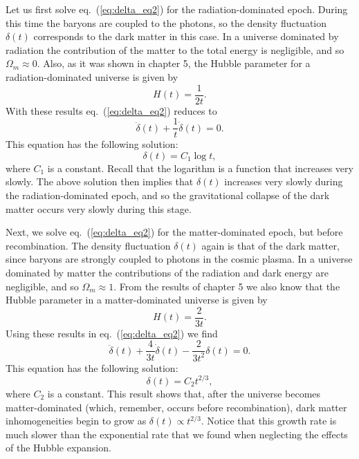 Let us first solve eq.\ (\ref{eq:delta_eq2}) for the radiation-dominated epoch. During this time the baryons are coupled to the photons, so the density fluctuation $\delta(t)$ corresponds to the dark matter in this case. In a universe dominated by radiation the contribution of the matter to the total energy is negligible, and so $\Omega_m\approx0$. Also, as it was shown in chapter 5, the Hubble parameter for a radiation-dominated universe is given by
\begin{equation}
H(t)=\frac{1}{2t}.
\end{equation}
With these results eq.\ (\ref{eq:delta_eq2}) reduces to
\begin{equation} \label{eq:delta_eq_rad}
\ddot{\delta}(t)+\frac{1}{t}\dot{\delta}(t)=0.
\end{equation}
This equation has the following solution:
\begin{equation}
\delta(t)=C_1\log t,
\end{equation}
where $C_1$ is a constant. Recall that the logarithm is a function that increases very slowly. The above solution then implies that $\delta(t)$ increases very slowly during the radiation-dominated epoch, and so the gravitational collapse of the dark matter occurs very slowly during this stage.

Next, we solve eq.\ (\ref{eq:delta_eq2}) for the matter-dominated epoch, but before recombination. The density fluctuation $\delta(t)$ again is that of the dark matter, since baryons are strongly coupled to photons in the cosmic plasma. In a universe dominated by matter the contributions of the radiation and dark energy are negligible, and so $\Omega_m\approx 1$. From the results of chapter 5 we also know that the Hubble parameter in a matter-dominated universe is given by
\begin{equation}
H(t)=\frac{2}{3t}.
\end{equation}
Using these results in eq.\ (\ref{eq:delta_eq2}) we find
\begin{equation} \label{eq:delta_eq_mat}
\ddot{\delta}(t)+\frac{4}{3t}\dot{\delta}(t)-\frac{2}{3t^2}\delta(t)=0.
\end{equation}
This equation has the following solution:
\begin{equation}
\delta(t)=C_2t^{2/3},
\end{equation}
where $C_2$ is a constant. This result shows that, after the universe becomes matter-dominated (which, remember, occurs before recombination), dark matter inhomogeneities begin to grow as $\delta(t)\propto t^{2/3}$. Notice that this growth rate is much slower than the exponential rate that we found when neglecting the effects of the Hubble expansion.

